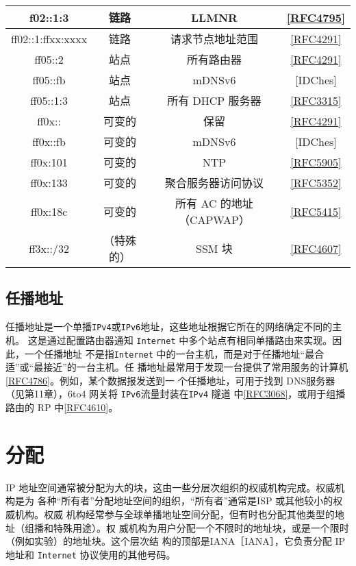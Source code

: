 \begin{table}[H]
\begin{tabular}{c|c|c|c}
        f02::1:3	&	链路	&	LLMNR	&	\href{https://www.rfc-editor.org/rfc/rfc4795}{[RFC4795]} \\ \hline
        ff02::1:ffxx:xxxx	&	链路	&	请求节点地址范围	&	\href{https://www.rfc-editor.org/rfc/rfc4291}{[RFC4291]} \\ \hline
        ff05::2	&	站点	&	所有路由器	&	\href{https://www.rfc-editor.org/rfc/rfc4291}{[RFC4291]} \\ \hline
        ff05::fb	&	站点	&	mDNSv6	&	[IDChes] \\ \hline
        ff05::1:3	&	站点	&	所有 DHCP 服务器	&	\href{https://www.rfc-editor.org/rfc/rfc3315}{[RFC3315]} \\ \hline
        ff0x::	&	可变的	&	保留	&	\href{https://www.rfc-editor.org/rfc/rfc4291}{[RFC4291]} \\ \hline
        ff0x::fb	&	可变的	&	mDNSv6	&	[IDChes] \\ \hline
        ff0x:101	&	可变的	&	NTP	&	\href{https://www.rfc-editor.org/rfc/rfc5905}{[RFC5905]} \\ \hline
        ff0x:133	&	可变的	&	聚合服务器访问协议	&	\href{https://www.rfc-editor.org/rfc/rfc5352}{[RFC5352]} \\ \hline
        ff0x:18c	&	可变的	&	所有 AC 的地址（CAPWAP）	&	\href{https://www.rfc-editor.org/rfc/rfc5415}{[RFC5415]} \\ \hline
        ff3x::/32	&	（特殊的）	&	SSM 块	&	\href{https://www.rfc-editor.org/rfc/rfc4607}{[RFC4607]} \\ \hline
    \end{tabular}
\end{table}

\subsection{任播地址}
任播地址是一个单播\verb|IPv4|或\verb|IPv6|地址，这些地址根据它所在的网络确定不同的主机。
这是通过配置路由器通知 \verb|Internet| 中多个站点有相同单播路由来实现。因此，一个任播地址
不是指\verb|Internet| 中的一台主机，而是对于任播地址“最合适”或“最接近”的一台主机。任
播地址最常用于发现一台提供了常用服务的计算机\href{https://www.rfc-editor.org/rfc/rfc4786}{[RFC4786]}。例如，某个数据报发送到一
个任播地址，可用于找到 DNS服务器（见第11章），6to4 网关将 \verb|IPv6|流量封装在\verb|IPv4| 隧道
中\href{https://www.rfc-editor.org/rfc/rfc3068}{[RFC3068]}，或用于组播路由的 RP 中\href{https://www.rfc-editor.org/rfc/rfc4610}{[RFC4610]}。

\section{分配}
IP 地址空间通常被分配为大的块，这由一些分层次组织的权威机构完成。权威机构是为
各种“所有者”分配地址空间的组织，“所有者”通常是ISP 或其他较小的权威机构。权威
机构经常参与全球单播地址空间分配，但有时也分配其他类型的地址（组播和特殊用途）。权
威机构为用户分配一个不限时的地址块，或是一个限时（例如实验）的地址块。这个层次结
构的顶部是IANA［IANA］，它负责分配 IP 地址和 \verb|Internet| 协议使用的其他号码。

